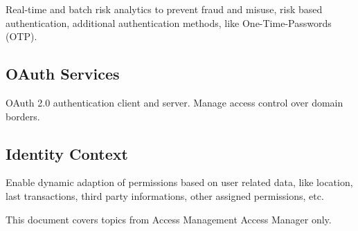 Real-time and batch risk analytics to prevent fraud and misuse, risk
based authentication, additional authentication methods, like
One-Time-Passwords (OTP).


\subsection{OAuth Services}

OAuth 2.0 authentication client and server. Manage access control over
domain borders.


\subsection{Identity Context}

Enable dynamic adaption of permissions based on user related data, like
location, last transactions, third party informations, other assigned
permissions, etc.


This document covers topics from Access Management Access Manager only.

